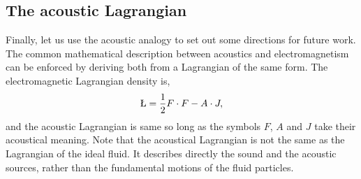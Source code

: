 \documentclass[10pt, fleqn,draft,showtrims,oldfontcommands]{article} %
\newcommand{\eqnref}[1]{\ref{eqn:#1}}
\begin{document}
\subsection{The acoustic Lagrangian}\label{sec:int:spin}
Finally, let us use the acoustic analogy to set out some directions for future work.
%
The common mathematical  description between acoustics and electromagnetism can be enforced by deriving both from a Lagrangian of the same form.
The electromagnetic Lagrangian density is\cite{Lasenby1993, Doran2003},
\begin{align}
 \L = \frac{1}{2} F \cdot F  - A \cdot J, \label{eqn:Lagrangian}
\end{align}
and the acoustic Lagrangian is same so long as the symbols $F$, $A$ and $J$ take their 
acoustical meaning.
Note that the acoustical Lagrangian is not the same as the Lagrangian of the ideal fluid.
It describes directly the sound and the acoustic sources,
rather than the fundamental motions of the fluid particles.
\end{document}
